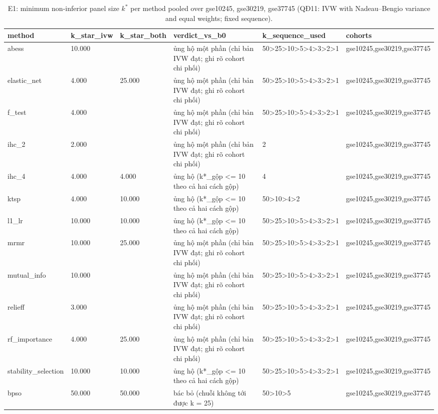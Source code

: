 \begin{table}[t]
  \centering
  \caption{E1: minimum non-inferior panel size $k^*$ per method pooled over gse10245, gse30219, gse37745 (QĐ11: IVW with Nadeau--Bengio variance and equal weights; fixed sequence).}
  \label{tab:e1_kstar}
  \small
  \begin{tabular}{llllll}
    \toprule
    method & k\_star\_ivw & k\_star\_both & verdict\_vs\_b0 & k\_sequence\_used & cohorts \\
    \midrule
    abess & 10.000 &  & ủng hộ một phần (chỉ bản IVW đạt; ghi rõ cohort chi phối) & 50>25>10>5>4>3>2>1 & gse10245,gse30219,gse37745 \\
    elastic\_net & 4.000 & 25.000 & ủng hộ một phần (chỉ bản IVW đạt; ghi rõ cohort chi phối) & 50>25>10>5>4>3>2>1 & gse10245,gse30219,gse37745 \\
    f\_test & 4.000 &  & ủng hộ một phần (chỉ bản IVW đạt; ghi rõ cohort chi phối) & 50>25>10>5>4>3>2>1 & gse10245,gse30219,gse37745 \\
    ihc\_2 & 2.000 &  & ủng hộ một phần (chỉ bản IVW đạt; ghi rõ cohort chi phối) & 2 & gse10245,gse30219,gse37745 \\
    ihc\_4 & 4.000 & 4.000 & ủng hộ (k*\_gộp <= 10 theo cả hai cách gộp) & 4 & gse10245,gse30219,gse37745 \\
    ktsp & 4.000 & 10.000 & ủng hộ (k*\_gộp <= 10 theo cả hai cách gộp) & 50>10>4>2 & gse10245,gse30219,gse37745 \\
    l1\_lr & 10.000 & 10.000 & ủng hộ (k*\_gộp <= 10 theo cả hai cách gộp) & 50>25>10>5>4>3>2>1 & gse10245,gse30219,gse37745 \\
    mrmr & 10.000 & 25.000 & ủng hộ một phần (chỉ bản IVW đạt; ghi rõ cohort chi phối) & 50>25>10>5>4>3>2>1 & gse10245,gse30219,gse37745 \\
    mutual\_info & 10.000 &  & ủng hộ một phần (chỉ bản IVW đạt; ghi rõ cohort chi phối) & 50>25>10>5>4>3>2>1 & gse10245,gse30219,gse37745 \\
    relieff & 3.000 &  & ủng hộ một phần (chỉ bản IVW đạt; ghi rõ cohort chi phối) & 50>25>10>5>4>3>2>1 & gse10245,gse30219,gse37745 \\
    rf\_importance & 4.000 & 25.000 & ủng hộ một phần (chỉ bản IVW đạt; ghi rõ cohort chi phối) & 50>25>10>5>4>3>2>1 & gse10245,gse30219,gse37745 \\
    stability\_selection & 10.000 & 10.000 & ủng hộ (k*\_gộp <= 10 theo cả hai cách gộp) & 50>25>10>5>4>3>2>1 & gse10245,gse30219,gse37745 \\
    bpso & 50.000 & 50.000 & bác bỏ (chuỗi không tới được k = 25) & 50>10>5 & gse10245,gse30219,gse37745 \\

\end{tabular}
\end{table}
